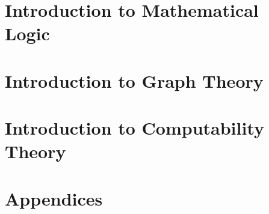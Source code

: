   \part{Introduction to Mathematical Logic}
  \label{part:logic}
  
  

  \part{Introduction to Graph Theory}
  \label{part:graph-theory}
  
  
  

  \part{Introduction to Computability Theory}
  \label{part:computability}
  
  
  
  
  
  

  \appendix
  \part{Appendices}
  

